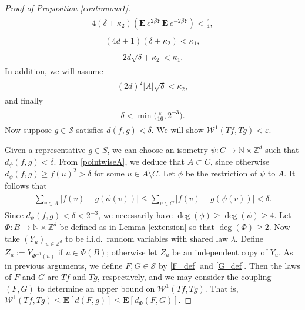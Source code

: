 \documentclass[11pt,reqno]{amsart}
\numberwithin{equation}{section}
\theoremstyle{definition}
\begin{document}
\begin{proof}[Proof of Proposition \ref{continuous1}]
{\begin{align} \begin{split} {
4(\delta+\kappa_2) ({\mathbf{E}}\, e^{2\beta Y}\, {\mathbf{E}}\, e^{-2\beta Y}) < \frac{\varepsilon}{4}, \label{delta6}
} \end{split} \end{align}}
{\begin{align} \begin{split} {
(4d+1)(\delta+\kappa_2) < \kappa_1, \label{delta3}
} \end{split} \end{align}}
{\begin{align} \begin{split} {
2d\sqrt{\delta+\kappa_2} < \kappa_1. \label{delta5}
} \end{split} \end{align}}
In addition, we will assume
{\begin{align} \begin{split} {
(2d)^2 |A| \sqrt{\delta} < \kappa_2, \label{borderA}
} \end{split} \end{align}}
and finally
{\begin{align} \begin{split} {
\delta < \min\Big(\frac{\varepsilon}{16},2^{-3}\Big). \label{delta4}
} \end{split} \end{align}}
Now suppose $g \in {\mathcal{S}}$ satisfies $d(f,g) < \delta$.
We will show ${\mathcal{W}}^1(Tf,Tg) < {\varepsilon}$.

Given a representative $g \in S$, we can choose an isometry $\psi : C \to {\mathbb{N}} \times {\mathbb{Z}}^d$ such that $d_\psi(f,g) < \delta$.
From \eqref{pointwiseA}, we deduce that $A \subset C$, since otherwise $d_\psi(f,g) \geq f(u)^2 > \delta$ for some $u \in A \setminus C$. 
Let $\phi$ be the restriction of $\psi$ to $A$.
It follows that
{\begin{align} \begin{split} {
\sum_{v \in A} |f(v) - g(\phi(v))| \leq \sum_{v \in C} |f(v) - g(\psi(v))| < \delta. \label{Asum}
} \end{split} \end{align}}
Since $d_\psi(f,g) < \delta < 2^{-3}$, we necessarily have $\deg(\phi) \geq \deg(\psi) \geq 4$.
Let $\Phi: B \to {\mathbb{N}} \times {\mathbb{Z}}^d$ be defined as in Lemma \ref{extension} so that $\deg(\Phi) \geq 2$.
Now take $(Y_u)_{u \in {\mathbb{Z}}^d}$ to be i.i.d.~random variables with shared law $\lambda$.
Define $Z_u := Y_{\Phi^{-1}(u)}$ if $u \in \Phi(B)$; otherwise let $Z_u$ be an independent copy of $Y_u$.
As in previous arguments, we define $F,G \in {\mathcal{S}}$ by \eqref{F_def} and \eqref{G_def}.
Then the laws of $F$ and $G$ are $Tf$ and $Tg$, respectively, and we may consider the coupling $(F,G)$ to determine an upper bound on ${\mathcal{W}}^1(Tf,Tg)$.
That is, ${\mathcal{W}}^1(Tf,Tg) \leq {\mathbf{E}}[d(F,g)] \leq {\mathbf{E}}[d_\Phi(F,G)]$.


\end{proof}
\end{document}
